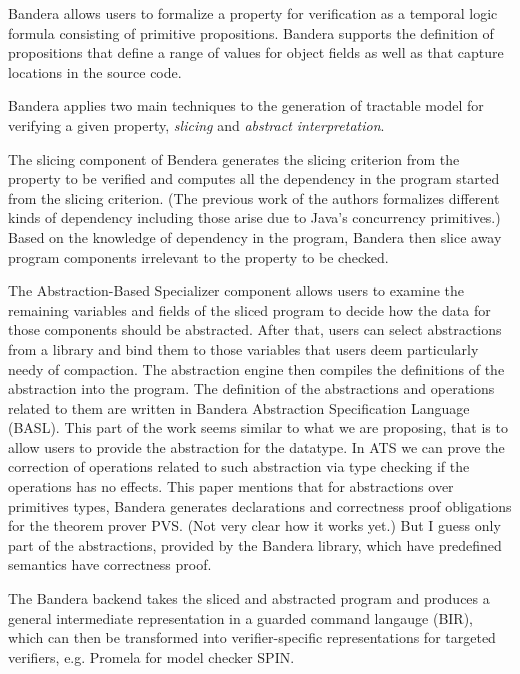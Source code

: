 \documentclass{llncs}
\begin{document}
Bandera allows users to formalize a property for verification as a temporal logic formula
consisting of primitive propositions. Bandera supports the definition of propositions that
define a range of values for object fields as well as that capture locations in the source code.

Bandera applies two main techniques to the generation of tractable model for verifying a given 
property, \emph{slicing} and \emph{abstract interpretation}. 

The slicing component of Bendera
generates the slicing criterion from the property to be verified and computes all the dependency
in the program started from the slicing criterion. (The previous work of the authors formalizes
different kinds of dependency including those arise due to Java's concurrency primitives.) Based
on the knowledge of dependency in the program, Bandera then slice away program components 
irrelevant to the property to be checked.

The Abstraction-Based Specializer component allows users to examine the remaining variables 
and fields of the sliced program to decide how the data for those components should be 
abstracted. After that, users can select abstractions from a library and bind them to those
variables that users deem particularly needy of compaction. The abstraction engine then 
compiles the definitions of the abstraction into the program. The definition of the abstractions
and operations related to them are written in Bandera Abstraction Specification Language (BASL).
This part of the work seems similar to what we are proposing, that is to allow users to provide the
abstraction for the datatype. In ATS we can prove the correction of operations related to
such abstraction via type checking if the operations has no effects. This paper mentions that
for abstractions over primitives types, Bandera generates declarations and correctness 
proof obligations for the theorem prover PVS. (Not very clear how it works yet.) But I guess
only part of the abstractions, provided by the Bandera library, which have predefined semantics
have correctness proof.

The Bandera backend takes the sliced and abstracted program and produces a general intermediate
representation in a guarded command langauge (BIR), which can then be transformed into 
verifier-specific representations for targeted verifiers, e.g. Promela for model checker SPIN.

\end{document}
